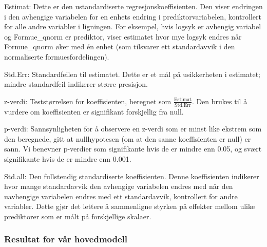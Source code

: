 \documentclass[
  12pt,
  a4paper,
  DIV=11,
  numbers=noendperiod]{scrartcl}
\begin{document}
Estimat: Dette er den ustandardiserte regresjonskoeffisienten. Den viser
endringen i den avhengige variabelen for en enhets endring i
prediktorvariabelen, kontrollert for alle andre variabler i ligningen.
For eksempel, hvis logsyk er avhengig variabel og Formue\_qnorm er
prediktor, viser estimatet hvor mye logsyk endres når Formue\_qnorm øker
med én enhet (som tilsvarer ett standardavvik i den normaliserte
formuesfordelingen).

Std.Err: Standardfeilen til estimatet. Dette er et mål på usikkerheten i
estimatet; mindre standardfeil indikerer større presisjon.

z-verdi: Teststørrelsen for koeffisienten, beregnet som
\(\frac{\text{Estimat}}{\text{Std.Err}}\). Den brukes til å vurdere om
koeffisienten er signifikant forskjellig fra null.

p-verdi: Sannsynligheten for å observere en z-verdi som er minst like
ekstrem som den beregnede, gitt at nullhypotesen (om at den sanne
koeffisienten er null) er sann. Vi benevner p-verdier som signifikante
hvis de er mindre enn 0.05, og svært signifikante hvis de er mindre enn
0.001.

Std.all: Den fullstendig standardiserte koeffisienten. Denne
koeffisienten indikerer hvor mange standardavvik den avhengige
variabelen endres med når den uavhengige variabelen endres med ett
standardavvik, kontrollert for andre variabler. Dette gjør det lettere å
sammenligne styrken på effekter mellom ulike prediktorer som er målt på
forskjellige skalaer.

\clearpage

\subsubsection{Resultat for vår
hovedmodell}\label{resultat-for-vuxe5r-hovedmodell}
\end{document}

